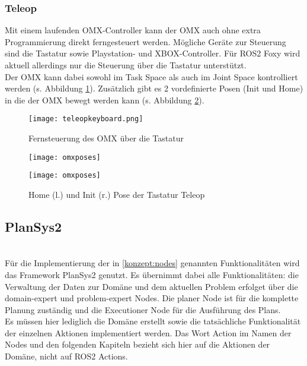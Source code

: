 \subsubsection{Teleop} \label{teleop}
Mit einem laufenden OMX-Controller kann der OMX auch ohne extra Programmierung direkt ferngesteuert werden. Mögliche Geräte zur Steuerung sind die Tastatur sowie Playstation- und XBOX-Controller. Für \ac{ROS2} Foxy wird aktuell allerdings nur die Steuerung über die Tastatur unterstützt.\\
Der OMX kann dabei sowohl im Task Space als auch im Joint Space kontrolliert werden (s. Abbildung \ref{fig:teleopkeyboard}). Zusätzlich gibt es 2 vordefinierte Posen (Init und Home) in die der OMX bewegt werden kann (s. Abbildung \ref{fig:teleopposes}).
\begin{figure}[ht!]
\centering
\texttt{[image: teleopkeyboard.png]}
\caption{Fernsteuerung des OMX über die Tastatur}
\label{fig:teleopkeyboard}
\end{figure}
\begin{figure}[htb]
    \centering
    \begin{minipage}[t]{0.45\linewidth}
        \centering
        \texttt{[image: omxposes]}
    \end{minipage}%
    \hfill
    \begin{minipage}[t]{0.45\linewidth}
        \centering
        \texttt{[image: omxposes]}
    \end{minipage}
    \caption{Home (l.) und Init (r.) Pose der Tastatur Teleop}
    \label{fig:teleopposes}
\end{figure}
\subsection{PlanSys2}
\cite{plansys}\\
Für die Implementierung der in \ref{konzept:nodes} genannten Funktionalitäten wird das Framework \ac{PlanSys2} genutzt. Es übernimmt dabei alle Funktionalitäten: die Verwaltung der Daten zur Domäne und dem aktuellen Problem erfolget über die domain-expert und problem-expert Nodes. Die planer Node ist für die komplette Planung zuständig und die Executioner Node für die Ausführung des Plans.\\
Es müssen hier lediglich die Domäne erstellt sowie die tatsächliche Funktionalität der einzelnen Aktionen implementiert werden. Das Wort Action im Namen der Nodes und den folgenden Kapiteln bezieht sich hier auf die Aktionen der Domäne, nicht auf \ac{ROS2} Actions.
